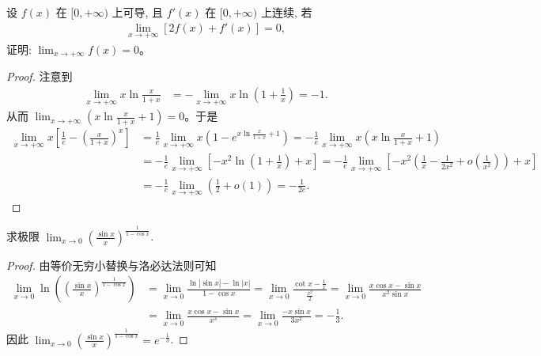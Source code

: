\documentclass[lang=cn,newtx,10pt,scheme=chinese]{../Template/elegantbook}
\begin{document}
\begin{example}
设 $f(x)$ 在 $[0, +\infty)$ 上可导, 且 $f'(x)$ 在 $[0, +\infty)$ 上连续, 若
\begin{align*}
\lim_{x \to +\infty} [2f(x) + f'(x)] = 0,
\end{align*}
证明: $\lim_{x \to +\infty} f(x) = 0$。
\end{example}
\begin{proof}
注意到
\begin{align*}
\lim_{x \to +\infty} x \ln \frac{x}{1 + x} &= -\lim_{x \to +\infty} x \ln \left( 1 + \frac{1}{x} \right) = -1.
\end{align*}
从而 $\lim_{x \to +\infty} \left( x \ln \frac{x}{1 + x} + 1 \right) = 0$。于是
\begin{align*}
\lim_{x \to +\infty} x \left[ \frac{1}{e} - \left( \frac{x}{1 + x} \right)^x \right] &= \frac{1}{e} \lim_{x \to +\infty} x \left( 1 - e^{x \ln \frac{x}{1 + x} + 1} \right) = -\frac{1}{e} \lim_{x \to +\infty} x \left( x \ln \frac{x}{1 + x} + 1 \right) \\
&= -\frac{1}{e} \lim_{x \to +\infty} \left[ -x^2 \ln \left( 1 + \frac{1}{x} \right) + x \right] = -\frac{1}{e} \lim_{x \to +\infty} \left[ -x^2 \left( \frac{1}{x} - \frac{1}{2x^2} + o\left( \frac{1}{x^2} \right) \right) + x \right] \\
&= -\frac{1}{e} \lim_{x \to +\infty} \left( \frac{1}{2} + o\left( 1 \right) \right) = -\frac{1}{2e}.
\end{align*}
\end{proof}

\begin{example}
求极限 $\lim_{x \to 0} \left( \frac{\sin x}{x} \right)^{\frac{1}{1 - \cos x}}$.
\end{example}
\begin{proof}
由等价无穷小替换与洛必达法则可知
\begin{align*}
\lim_{x \to 0} \ln \left( \left( \frac{\sin x}{x} \right)^{\frac{1}{1 - \cos x}} \right) &= \lim_{x \to 0} \frac{\ln \left| \sin x \right| - \ln \left| x \right|}{1 - \cos x} = \lim_{x \to 0} \frac{\cot x - \frac{1}{x}}{\frac{x^2}{2}} = \lim_{x \to 0} \frac{x \cos x - \sin x}{x^2 \sin x} \\
&= \lim_{x \to 0} \frac{x \cos x - \sin x}{x^3} = \lim_{x \to 0} \frac{-x \sin x}{3x^2} = -\frac{1}{3}.
\end{align*}
因此 $\lim_{x \to 0} \left( \frac{\sin x}{x} \right)^{\frac{1}{1 - \cos x}} = e^{-\frac{1}{3}}$.
\end{proof}
\end{document}
